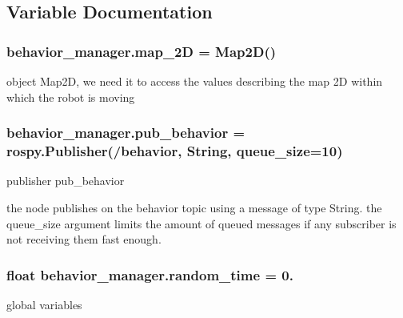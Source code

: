 \subsection{Variable Documentation}
\subsubsection[{\texorpdfstring{map\+\_\+2D}{map_2D}}]{\setlength{\rightskip}{0pt plus 5cm}behavior\+\_\+manager.\+map\+\_\+2D = {\bf Map2D}()}\hypertarget{namespacebehavior__manager_afe2fe1010a2f35436221d7762966e6d7}{}\label{namespacebehavior__manager_afe2fe1010a2f35436221d7762966e6d7}


object Map2D, we need it to access the values describing the map 2D within which the robot is moving 

\subsubsection[{\texorpdfstring{pub\+\_\+behavior}{pub_behavior}}]{\setlength{\rightskip}{0pt plus 5cm}behavior\+\_\+manager.\+pub\+\_\+behavior = rospy.\+Publisher(\textquotesingle{}/behavior\textquotesingle{}, String, queue\+\_\+size=10)}\hypertarget{namespacebehavior__manager_ac30069bca00035c62a13df72bf29a3aa}{}\label{namespacebehavior__manager_ac30069bca00035c62a13df72bf29a3aa}


publisher pub\+\_\+behavior 

the node publishes on the behavior topic using a message of type String. the queue\+\_\+size argument limits the amount of queued messages if any subscriber is not receiving them fast enough. 
\subsubsection[{\texorpdfstring{random\+\_\+time}{random_time}}]{\setlength{\rightskip}{0pt plus 5cm}float behavior\+\_\+manager.\+random\+\_\+time = 0.}\hypertarget{namespacebehavior__manager_a53d496c1cdb4a1a21f698d78a6baeb6e}{}\label{namespacebehavior__manager_a53d496c1cdb4a1a21f698d78a6baeb6e}


global variables 

